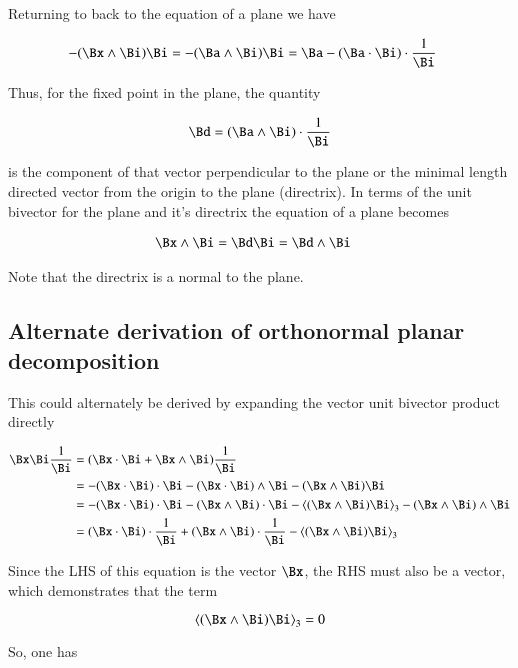 Returning to back to the equation of a plane we have

\begin{align*}
- (\Bx \wedge \Bi)\Bi &= - (\Ba \wedge \Bi)\Bi = \Ba - (\Ba \cdot \Bi) \cdot \frac{1}{\Bi}
\end{align*}

Thus, for the fixed point in the plane, the quantity

\[
\Bd = (\Ba \wedge \Bi) \cdot \frac{1}{\Bi}
\]

is the component of that vector perpendicular to the plane or the minimal length directed vector from the origin to the plane (directrix).  In terms 
of the unit bivector for the plane and it's directrix the equation of a 
plane becomes

\begin{align*}
\Bx \wedge \Bi &= \Bd \Bi = \Bd \wedge \Bi
\end{align*}

Note that the directrix is a normal to the plane.

\subsection{Alternate derivation of orthonormal planar decomposition }

This could alternately be derived by expanding the vector unit bivector
product directly

\begin{align*}
\Bx \Bi \frac{1}{\Bi} 
&= ( \Bx \cdot \Bi + \Bx \wedge \Bi ) \frac{1}{\Bi} \\
&= 
- {(\Bx \cdot \Bi) \cdot \Bi} - {(\Bx \cdot \Bi) \wedge \Bi} - {(\Bx \wedge \Bi) \Bi} \\
&= 
- {(\Bx \cdot \Bi) \cdot \Bi} - {(\Bx \wedge \Bi) \cdot \Bi } - {\left<(\Bx \wedge \Bi) \Bi\right>_3} - {(\Bx \wedge \Bi) \wedge \Bi} \\
&= 
{(\Bx \cdot \Bi) \cdot \frac{1}{\Bi}} + {(\Bx \wedge \Bi) \cdot \frac{1}{\Bi}} - {\left<(\Bx \wedge \Bi) \Bi\right>_3} \\
\end{align*}

Since the LHS of this equation is the vector $\Bx$, the RHS must
also be a vector, which demonstrates that the term

\[
\left<(\Bx \wedge \Bi) \Bi\right>_3 = 0
\]

So, one has

